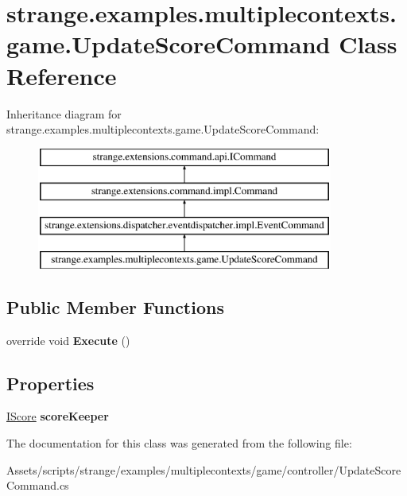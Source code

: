 \hypertarget{classstrange_1_1examples_1_1multiplecontexts_1_1game_1_1_update_score_command}{\section{strange.\-examples.\-multiplecontexts.\-game.\-Update\-Score\-Command Class Reference}
\label{classstrange_1_1examples_1_1multiplecontexts_1_1game_1_1_update_score_command}
}
Inheritance diagram for strange.\-examples.\-multiplecontexts.\-game.\-Update\-Score\-Command\-:\begin{figure}[H]
\begin{center}
\leavevmode
\includegraphics[height=4.000000cm]{classstrange_1_1examples_1_1multiplecontexts_1_1game_1_1_update_score_command}
\end{center}
\end{figure}
\subsection*{Public Member Functions}
\begin{DoxyCompactItemize}
\item 
\hypertarget{classstrange_1_1examples_1_1multiplecontexts_1_1game_1_1_update_score_command_a9b946141cd000018236638682cfa9d87}{override void {\bfseries Execute} ()}\label{classstrange_1_1examples_1_1multiplecontexts_1_1game_1_1_update_score_command_a9b946141cd000018236638682cfa9d87}

\end{DoxyCompactItemize}
\subsection*{Properties}
\begin{DoxyCompactItemize}
\item 
\hypertarget{classstrange_1_1examples_1_1multiplecontexts_1_1game_1_1_update_score_command_a1856e7c3f58369d5981efa001a4b0f49}{\hyperlink{interfacestrange_1_1examples_1_1multiplecontexts_1_1game_1_1_i_score}{I\-Score} {\bfseries score\-Keeper}}\label{classstrange_1_1examples_1_1multiplecontexts_1_1game_1_1_update_score_command_a1856e7c3f58369d5981efa001a4b0f49}

\end{DoxyCompactItemize}


The documentation for this class was generated from the following file\-:\begin{DoxyCompactItemize}
\item 
Assets/scripts/strange/examples/multiplecontexts/game/controller/Update\-Score\-Command.\-cs\end{DoxyCompactItemize}
